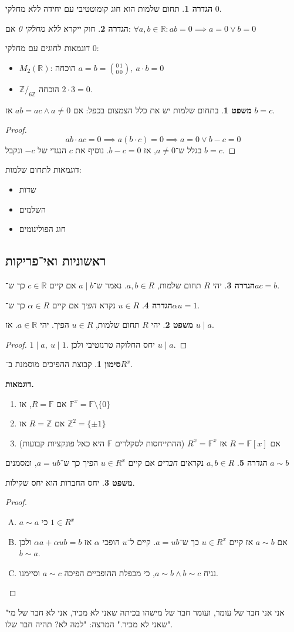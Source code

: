 \documentclass[a4paper]{article}
\newcommand\Z     {\mathbb{Z}}
\newcommand\R     {\mathbb{R}}
\newcommand\F         {\mathbb{F}}
\newcommand\co        {\colon}
\newcommand\ag        {\alpha}
\theoremstyle{definition}
\newtheorem{Theorem}{\color{myblue}משפט}
\newtheorem{Definition}{\color{mygreen}הגדרה}
\newtheorem{Notion}{\color{myred}סימון}
\newcommand\theo  [1] {\begin{Theorem}#1\end{Theorem}}
\newcommand\defi  [1] {\begin{Definition}#1\end{Definition}}
\newcommand\noti  [1] {\begin{Notion}#1\end{Notion}}
\begin{document}
	
	\defi{תחום שלמות הוא חוג קומוטטיבי עם יחידה ללא מחלקי $0$. }
	\defi{חוק ייקרא \textit{ללא מחלקי 0} אם: \hfill $\forall a, b \in \R \co ab = 0 \implies a = 0 \lor b = 0$}
	
	דוגמאות לחוגים עם מחלקי $0$: 
	\begin{itemize}
		\item $M_2(\R)$: הוכחה $a = b = \binom{0\, 1}{0\, 0}, \ a \cdot b = 0$
		\item $\Z/_{6\Z}$ הוכחה $2 \cdot 3 = 0$. 
	\end{itemize}
	
	\theo{בתחום שלמות יש את כלל הצמצום בכפל: אם $ab = ac \land a \neq 0$ אז $b = c$. }\begin{proof}
		\[ ab  \cdot ac = 0 \implies a(b \cdot c) = 0 \implies a = 0 \lor b - c = 0 \]
		בגלל ש־$a \neq 0$, אז $b - c = 0$. נוסיף את $c$ הנגדי של $-c$ ונקבל $b = c$. 
	\end{proof}
	
	דוגמאות לתחום שלמות: 
	\begin{itemize}
		\item שדות
		\item השלמים
		\item חוג הפולינומים
	\end{itemize}
	
	\subsection{ראשוניות ואי־פריקות}
	\defi{יהי $R$ תחום שלמות, $a, b \in R$. נאמר ש־$a \mid b$ אם קיים $c \in \R$ כך ש־$ac = b$. }
	\defi{$u \in R$ נקרא \textit{הפיך} אם קיים $\ag \in R$ כך ש־$\ag u = 1$. }
	\theo{יהי $R$ תחום שלמות, $u \in R$ הפיך. יהי $a \in \R$. אז $u \mid a$. }\begin{proof}
		$1 \mid a, \ u \mid 1$. יחס החלוקה טרנזטיבי ולכן $u \mid a$. 
	\end{proof}
	\noti{קבוצת ההפיכים מוסמנת ב־$R^x$. }
	\textbf{דוגמאות. }
	\begin{enumerate}
		\item אם $R = \F$, אז $\F^x = \F \setminus \{0\}$
		\item אם $R = \Z$ אז $\Z^2 = \{\pm 1\}$
		\item אם $R = \F[x]$ אז $R^x = \F^x$ (ההתייחסות לסקלרים $\F$ היא כאל פונקציות קבועות)
	\end{enumerate}
	\defi{$a, b \in R$ נקראים \textit{חברים} אם קיים $u \in R^x$ הפיך כך ש־$a = ub$, ומסמנים $a \sim b$ }
	
	\theo{יחס החברות הוא יחס שקילות. }
	\begin{proof}\,
		\begin{enumerate}[A.]
			\item $a \sim a$ כי $1 \in R^x$
			\item אם $a \sim b$ אז קיים $u \in R^x$ כך ש־$a = ub$. קיים ל־$u$ הופכי $\ag$ אז $\ag a + \ag u b = b$ ולכן $b \sim a$. 
			\item נניח $a \sim b \land b \sim c$, כי מכפלת ההופכיים הפיכה $a \sim c$ וסיימנו. 
		\end{enumerate}
	\end{proof}
	"אני אני חבר של עומר, ועומר חבר של מישהו בכיתה שאני לא מכיר, אני לא חבר של מי שאני לא מכיר." המרצה: "למה לא? תהיה חבר שלו". 
	
\end{document}
